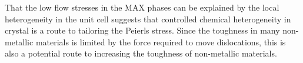 That the low flow stresses in the MAX phases can be explained by the local heterogeneity in the unit cell suggests that controlled chemical heterogeneity in crystal is a route to tailoring the Peierls stress. Since the toughness in many non-metallic materials is limited by the force required to move dislocations, this is also a potential route to increasing the toughness of non-metallic materials.






























